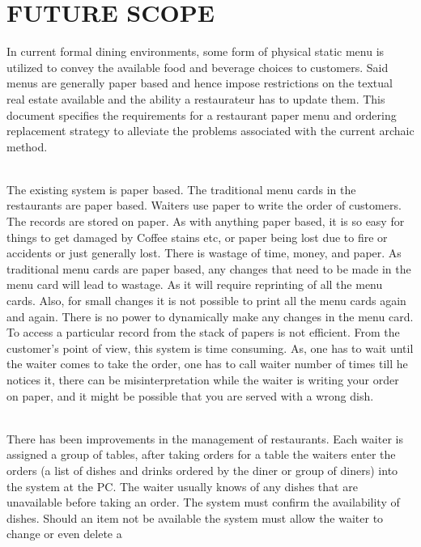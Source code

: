 \documentclass[12pt,a4paper]{report}
\begin{document}
\chapter{FUTURE SCOPE}
\hspace{0.25cm}
\par
In current formal dining environments, some form of physical
static menu is utilized to convey the available food and beverage
choices to customers. Said menus are generally paper based and
hence impose restrictions on the textual real estate available and
the ability a restaurateur has to update them. This document
specifies the requirements for a restaurant paper menu and
ordering replacement strategy to alleviate the problems
associated with the current archaic method.
\\
\\
\par
The existing system is paper based. The traditional menu cards
in the restaurants are paper based. Waiters use paper to write the
order of customers. The records are stored on paper. As with
anything paper based, it is so easy for things to get damaged by
Coffee stains etc, or paper being lost due to fire or accidents or
just generally lost. There is wastage of time, money, and paper.
As traditional menu cards are paper based, any changes that need
to be made in the menu card will lead to wastage. As it will
require reprinting of all the menu cards. Also, for small changes
it is not possible to print all the menu cards again and again.
There is no power to dynamically make any changes in the menu
card. To access a particular record from the stack of papers is not
efficient. From the customer’s point of view, this system is time
consuming. As, one has to wait until the waiter comes to take the
order, one has to call waiter number of times till he notices it,
there can be misinterpretation while the waiter is writing your
order on paper, and it might be possible that you are served with
a wrong dish.
\\
\\
\par
There has been improvements in the management of restaurants. Each waiter is assigned a group of tables, after
taking orders for a table the waiters enter the orders (a list of
dishes and drinks ordered by the diner or group of diners) into
the system at the PC. The waiter usually knows of any dishes that
are unavailable before taking an order. The system must confirm
the availability of dishes. Should an item not be available the
system must allow the waiter to change or even delete a
\end{document}
